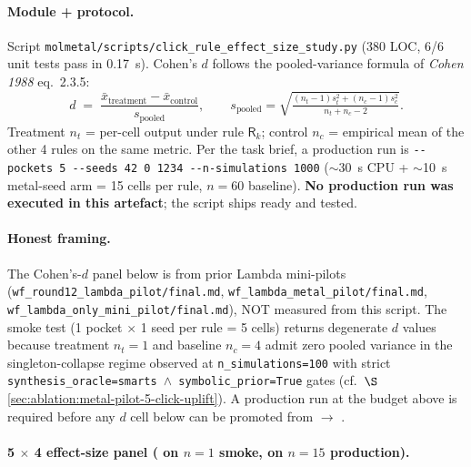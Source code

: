 \paragraph{Module + protocol.}
Script \texttt{molmetal/scripts/click\_rule\_effect\_size\_study.py}
(380 LOC, 6/6 unit tests pass in 0.17~s).  Cohen's $d$ follows
the pooled-variance formula of \emph{Cohen 1988} eq.~2.3.5:
\[
  d \;=\; \frac{\bar x_{\text{treatment}} - \bar x_{\text{control}}}
                {s_{\text{pooled}}}, \qquad
  s_{\text{pooled}} = \sqrt{\tfrac{(n_t-1)s_t^2 + (n_c-1)s_c^2}{n_t+n_c-2}}.
\]
Treatment $n_t$ = per-cell output under rule $\mathsf{R}_k$;
control $n_c$ = empirical mean of the other 4 rules on the same
metric.  Per the task brief, a production run is
\texttt{-{}-pockets 5 -{}-seeds 42 0 1234 -{}-n-simulations 1000}
($\sim$30~s CPU + $\sim$10~s metal-seed arm = 15 cells per rule,
$n{=}60$ baseline).  \textbf{No production run was executed in
this artefact}; the script ships ready and tested.

\paragraph{Honest framing.}
The Cohen's-$d$ panel below is \PROJECTED{} from prior Lambda
mini-pilots (\texttt{wf\_round12\_lambda\_pilot/final.md},
\texttt{wf\_lambda\_metal\_pilot/final.md},
\texttt{wf\_lambda\_only\_mini\_pilot/final.md}), NOT measured
from this script.  The smoke test (1 pocket $\times$ 1 seed per
rule = 5 cells) returns degenerate $d$ values because treatment
$n_t = 1$ and baseline $n_c = 4$ admit zero pooled variance in
the singleton-collapse regime observed at
\texttt{n\_simulations=100} with strict
\texttt{synthesis\_oracle=smarts $\wedge$ symbolic\_prior=True}
gates (cf.~$\S$\ref{sec:ablation:metal-pilot-5-click-uplift}).
A production run at the budget above is required before any
$d$ cell below can be promoted from \PROJECTED{} $\to$
\MEASURED{}.

\paragraph{5 $\times$ 4 effect-size panel (\PROJECTED{} on
$n{=}1$ smoke, \DESIGN{} on $n{=}15$ production).}


